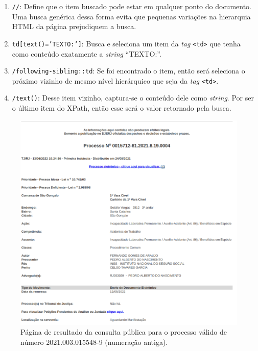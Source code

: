 \begin{enumerate}
    \item \texttt{//}: Define que o item buscado pode estar em qualquer ponto
        do documento. Uma busca genérica dessa forma evita que pequenas
        variações na hierarquia HTML da página prejudiquem a busca.
    \item \texttt{td[text()='TEXTO:']}: Busca e seleciona um item da
        \textit{tag} \texttt{<td>} que tenha como conteúdo exatamente a
        \textit{string} ``TEXTO:''.
    \item \texttt{/following-sibling::td}: Se foi encontrado o item, então será
        seleciona o próximo vizinho de mesmo nível hierárquico que seja da
        \textit{tag} \texttt{<td>}.
    \item \texttt{/text()}: Desse item vizinho, captura-se o conteúdo dele como
        \textit{string}. Por ser o último item do XPath, então esse será o
        valor retornado pela busca.
\end{enumerate}


\begin{figure}[H]
    \centering{}
    \includegraphics{img/exemplo-resultado-consulta-publica-1.png}
    \caption{%
        Página de resultado da consulta pública para o processo válido de
        número 2021.003.015548-9 (numeração antiga).
    }
    \label{fig:exemplo-pagina-ww4}
\end{figure}

